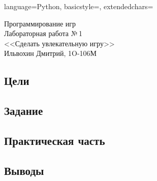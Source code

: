 \documentclass[12pt]{article}
\newcommand{\StudentName}{Ильвохин Дмитрий}
\newcommand{\Group}{1O-106М}
\newcommand{\CourseName}{Программирование игр}
\newcommand{\LabNum}{1}
\newcommand{\Subject}{Сделать увлекательную игру}
\begin{document}

\lstset
{
        language=Python,
        basicstyle=\footnotesize,%
        extendedchars=\true
}

\begin{flushright}
\Large{
	\CourseName \\
	Лабораторная работа №\,\LabNum \\
	<<\Subject>> \\
  \StudentName, \Group \\
}
\end{flushright}

\subsection*{Цели}

\subsection*{Задание}

\subsection*{Практическая часть}

\subsection*{Выводы}
\end{document}
